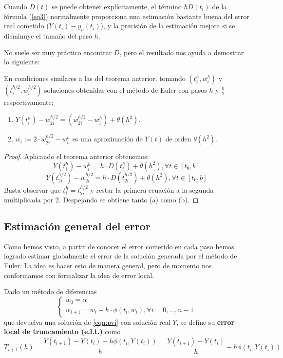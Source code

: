 \begin{remark}
Cuando $D(t)$ se puede obtener explícitamente, el término $hD(t_i)$ de la fórmula  (\ref{eq3}) normalmente proporciona una estimación bastante buena del error real cometido ($Y(t_i) - y_h(t_i)$), y la precisión de la estimación mejora si se disminuye el tamaño del paso $h$.
\end{remark}
 No suele ser muy práctico encontrar $D$, pero el resultado nos ayuda a demostrar lo siguiente:

\begin{theorem}
    En condiciones similares a las del teorema anterior, tomando $(t_i^h,w_i^h)$ y $(t_i^{h/2},w_i^{h/2})$ soluciones obtenidas con el método de Euler con pasos $h$ y $\frac{h}{2}$ respectivamente:
    \begin{enumerate}[label=(\alph*)]
        \item $Y(t_i^h)-w_{2i}^{h/2} = (w_{2i}^{h/2}-w_i^h) + \theta(h^2)$.
        \item $w_i := 2\cdot w_{2i}^{h/2}-w_i^h$ es una aproximación de $Y(t)$ de orden $\theta(h^2)$.
    \end{enumerate}
\end{theorem}

\begin{proof}
    Aplicando el teorema anterior obtenemos:
    $$
    Y(t_i^h)-w_i^h=h\cdot D(t_i^h)+\theta(h^2),\forall t\in[t_0,b]
    $$
    $$
    Y(t_{2i}^{h/2})-w_{2i}^{h/2}=h\cdot D(t_{2i}^{h/2})+\theta(h^2),\forall t\in[t_0,b]
    $$
    Basta observar que $t_i^h = t_{2i}^{h/2}$ y restar la primera ecuación a la segunda multiplicada por 2. Despejando se obtiene tanto (a) como (b).

\end{proof}

\subsection{Estimación general del error}

Como hemos visto, a partir de conocer el error cometido en cada paso hemos logrado estimar globalmente el error de la solución generada por el método de Euler. La idea es hacer esto de manera general, pero de momento nos conformamos con formalizar la idea de error local.

\begin{definition}
Dado un método de diferencias
\begin{equation} \label{eqn:diffmet}
\begin{cases}
    w_0=\alpha \\
    w_{i+1}=w_i + h\cdot \phi(t_i, w_i), \forall i=0,\dots, n-1
\end{cases}
\end{equation}
    que devuelva una solución de \ref{eqn:pvi} con solución real $Y$, se define su \textbf{error local de truncamiento (e.l.t.)} como
    $$
    T_{i+1}(h) = \frac{Y(t_{i+1})-Y(t_i)-h\phi(t_i,Y(t_i))}{h}
    = \frac{Y(t_{i+1})-Y(t_i)}{h} -h\phi(t_i,Y(t_i))
    $$
\end{definition}


